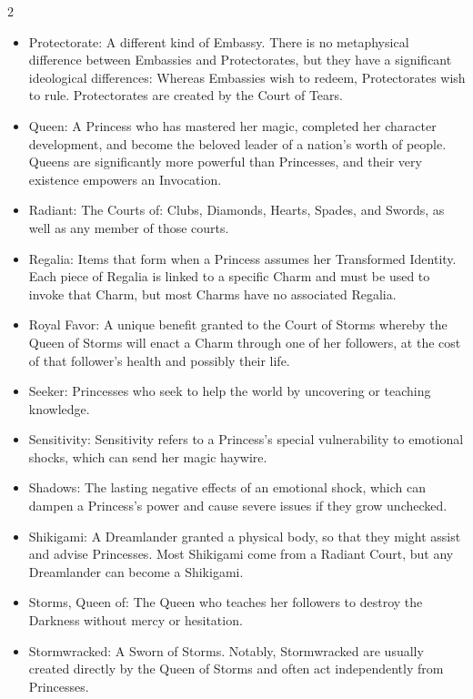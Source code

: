 \begin{multicols}{2}
\begin{itemize}
  \item Protectorate: A different kind of Embassy. There is no metaphysical difference between Embassies and Protectorates, but they have a significant ideological differences: Whereas Embassies wish to redeem, Protectorates wish to rule. Protectorates are created by the Court of Tears. 
  \item Queen: A Princess who has mastered her magic, completed her character development, and become the beloved leader of a nation's worth of people. Queens are significantly more powerful than Princesses, and their very existence empowers an Invocation. 
  \item Radiant: The Courts of: Clubs, Diamonds, Hearts, Spades, and Swords, as well as any member of those courts.
  \item Regalia: Items that form when a Princess assumes her Transformed Identity. Each piece of Regalia is linked to a specific Charm and must be used to invoke that Charm, but most Charms have no associated Regalia. 
  \item Royal Favor: A unique benefit granted to the Court of Storms whereby the Queen of Storms will enact a Charm through one of her followers, at the cost of that follower's health and possibly their life. 
  \item Seeker: Princesses who seek to help the world by uncovering or teaching knowledge. 
  \item Sensitivity: Sensitivity refers to a Princess's special vulnerability to emotional shocks, which can send her magic haywire.
  \item Shadows: The lasting negative effects of an emotional shock, which can dampen a Princess's power and cause severe issues if they grow unchecked. 
  \item Shikigami: A Dreamlander granted a physical body, so that they might assist and advise Princesses. Most Shikigami come from a Radiant Court, but any Dreamlander can become a Shikigami. 
  \item Storms, Queen of: The Queen who teaches her followers to destroy the Darkness without mercy or hesitation.
  \item Stormwracked: A Sworn of Storms. Notably, Stormwracked are usually created directly by the Queen of Storms and often act independently from Princesses. 

\end{itemize}
\end{multicols}
